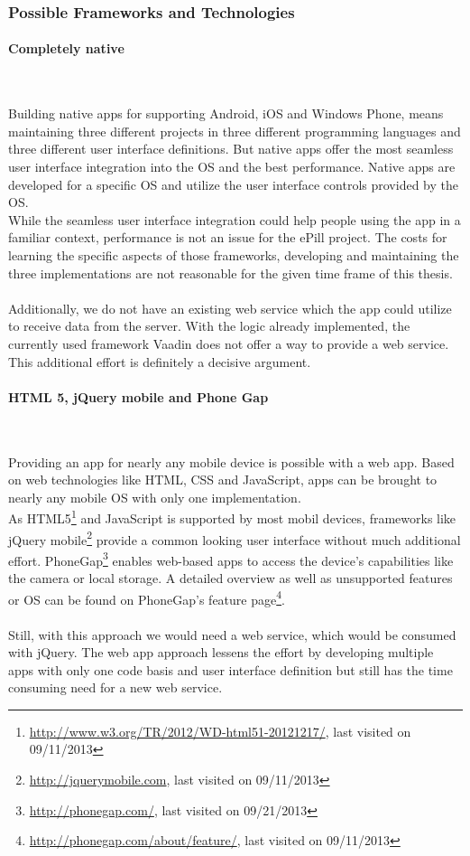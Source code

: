 \subsubsection{Possible Frameworks and Technologies}
\paragraph{Completely native}$\;$

\vspace{0.75em}
Building native apps for supporting Android, iOS and Windows Phone, means maintaining three different projects in three different programming languages and three different user interface definitions. But native apps offer the most seamless user interface integration into the OS and the best performance. Native apps are developed for a specific OS and utilize the user interface controls provided by the OS. 
\\
While the seamless user interface integration could help people using the app in a familiar context, performance is not an issue for the ePill project. The costs for learning the specific aspects of those frameworks, developing and maintaining the three implementations are not reasonable for the given time frame of this thesis.
\\
\\
Additionally, we do not have an existing web service which the app could utilize to receive data from the server. With the logic already implemented, the currently used framework Vaadin does not offer a way to provide a web service. This additional effort is definitely a decisive argument.

\paragraph{HTML 5, jQuery mobile and Phone Gap}$\;$

\vspace{0.75em}
Providing an app for nearly any mobile device is possible with a web app. Based on web technologies like HTML, CSS and JavaScript, apps can be brought to nearly any mobile OS with only one implementation.
\\
As HTML5\footnote{\url{http://www.w3.org/TR/2012/WD-html51-20121217/}, last visited on 09/11/2013} and JavaScript is supported by most mobil devices, frameworks like jQuery mobile\footnote{\url{http://jquerymobile.com}, last visited on 09/11/2013} provide a common looking user interface without much additional effort. PhoneGap\footnote{\url{http://phonegap.com/}, last visited on 09/21/2013} enables web-based apps to access the device's capabilities like the camera or local storage. A detailed overview as well as unsupported features or OS can be found on PhoneGap's feature page\footnote{\url{http://phonegap.com/about/feature/}, last visited on 09/11/2013}.
\\
\\
Still, with this approach we would need a web service, which would be consumed with jQuery. The web app approach lessens the effort by developing multiple apps with only one code basis and user interface definition but still has the time consuming need for a new web service.

